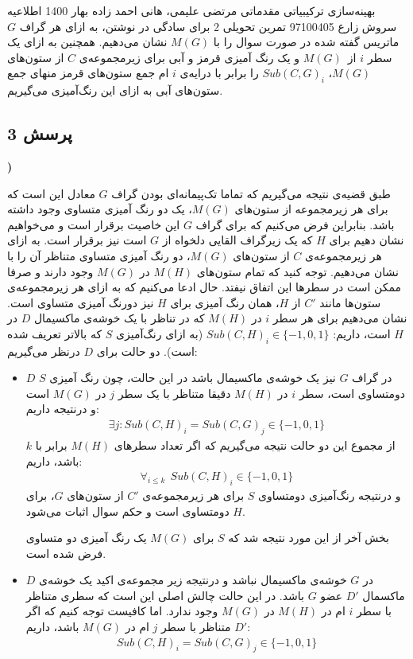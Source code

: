 \documentclass[a4paper,12pt]{article}
\newcounter{problemcounter}
\newcounter{subproblemcounter}
\newcommand{\problem}[1]
{
	\subsection*{
		پرسش
		#1
	}
}
\newcommand{\subproblem}{
	\textbf{\harfi{subproblemcounter})}\stepcounter{subproblemcounter}
}
\begin{document}
\handout
{بهینه‌سازی ترکیبیاتی مقدماتی}
{مرتضی علیمی، هانی احمد زاده}
{بهار 1400}
{اطلاعیه}
{سروش زارع}
{97100405}
 {تمرین تحویلی 2}
برای سادگی در نوشتن، به ازای هر گراف $G$ ماتریس گفته شده در صورت سوال را با
$M(G)$
نشان می‌دهیم. 
همچنین به ازای یک سطر $i$ از $M(G)$ و یک رنگ آمیزی قرمز و آبی برای زیرمجموعه‌ی $C$ از ستون‌های
$M(G)$، 
$Sub(C, G)_i$
را برابر با درایه‌ی $i$ ام جمع‌ ستون‌های قرمز منهای جمع ستون‌های آبی به ازای این رنگ‌آمیزی می‌گیریم.
\problem{3}
\subproblem
طبق قضیه‌ی 
نتیجه می‌گیریم که تماما تک‌پیمانه‌ای بودن گراف $G$ معادل این است که برای هر زیرمجموعه از ستون‌های $M(G)$،  یک دو رنگ آمیزی متساوی وجود داشته باشد. بنابراین فرض می‌کنیم که برای گراف $G$ این خاصیت برقرار است و می‌خواهیم نشان دهیم برای $H$ که یک زیرگراف القایی دلخواه از $G$ است نیز برقرار است. 
به ازای هر زیرمجموعه‌ی $C$ از ستون‌های $M(G)$، دو رنگ آمیزی متساوی متناظر آن را با 
نشان می‌دهیم. توجه کنید که تمام ستون‌های $M(H)$ در $M(G)$ وجود دارند و صرفا ممکن است در سطر‌ها این اتفاق نیفتد. حال ادعا می‌کنیم که به ازای هر زیرمجموعه‌ی ستون‌ها مانند $C'$ از $H$، همان رنگ آمیزی
برای
$H$
نیز دورنگ آمیزی متساوی است.
\newline
\proof{}
نشان می‌دهیم برای هر سطر $i$ در $M(H)$ که در تناظر با یک خوشه‌ی ماکسیمال $D$ در $H$ است، داریم: 
$Sub(C, H)_i \in \{-1,0,1\}$
(به ازای رنگ‌آمیزی $S$ که بالاتر تعریف شده است).
دو حالت برای $D$ درنظر می‌گیریم:
\begin{itemize}
	\item $D$ در گراف $G$ نیز یک خوشه‌ی ماکسیمال باشد \newline \newline
در این حالت، چون رنگ آمیزی $S$ دومتساوی است، سطر $i$ در $M(H)$ دقیقا متناظر با یک سطر $j$ در $M(G)$ است و درنتیجه داریم:
\begin{align*}
	\exists j: Sub(C, H)_i = Sub(C, G)_j \in \{-1,0,1\}
\end{align*}
از مجموع این دو حالت نتیجه می‌گیریم که اگر تعداد سطر‌های $M(H)$ برابر با $k$ باشد، داریم:
\begin{align*}
	\forall_{i \leq k} \ \ Sub(C, H)_i \in \{-1,0,1\}
\end{align*}
و درنتیجه رنگ‌آمیزی دومتساوی $S$ برای هر زیرمجموعه‌ی $C'$ از ستون‌های $G$، برای $H$  دومتساوی است و حکم سوال اثبات می‌شود.

بخش آخر از این مورد نتیجه شد که $S$ برای $M(G)$ یک رنگ آمیزی دو متساوی فرض شده است.
	\item $D$ در $G$ خوشه‌ی ماکسیمال نباشد و درنتیجه زیر مجموعه‌ی اکید یک خوشه‌ی ماکسمال $D'$ عضو $G$ باشد. \newline \newline
در این حالت چالش اصلی این است که سطری متناظر با سطر $i$ ام در $M(H)$ در $M(G)$ وجود ندارد. اما کافیست توجه کنیم که اگر $D'$ متناظر با سطر $j$ ام در $M(G)$ باشد، داریم:
\begin{align*}
	Sub(C, H)_i = Sub(C, G)_j \in \{-1,0,1\}
\end{align*}
\end{itemize}
\end{document}
